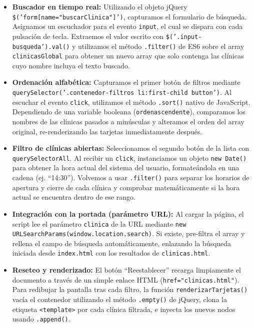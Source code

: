 \documentclass[11pt]{article}
\begin{document}
\begin{itemize}
\item \textbf{Buscador en tiempo real:} Utilizando el objeto jQuery \texttt{\$('form[name="buscarClinica"]')}, capturamos el formulario de búsqueda. Asignamos un escuchador para el evento \texttt{input}, el cual se dispara con cada pulsación de tecla. Extraemos el valor escrito con \texttt{\$('.input-busqueda').val()} y utilizamos el método \texttt{.filter()} de ES6 sobre el array \texttt{clinicasGlobal} para obtener un nuevo array que solo contenga las clínicas cuyo nombre incluya el texto buscado.
\item \textbf{Ordenación alfabética:} Capturamos el primer botón de filtros mediante \texttt{querySelector('.contenedor-filtros li:first-child button')}. Al escuchar el evento \texttt{click}, utilizamos el método \texttt{.sort()} nativo de JavaScript. Dependiendo de una variable booleana (\texttt{ordenascendente}), comparamos los nombres de las clínicas pasados a minúsculas y alteramos el orden del array original, re-renderizando las tarjetas inmediatamente después.
\item \textbf{Filtro de clínicas abiertas:} Seleccionamos el segundo botón de la lista con \texttt{querySelectorAll}. Al recibir un \texttt{click}, instanciamos un objeto \texttt{new Date()} para obtener la hora actual del sistema del usuario, formateándola en una cadena (ej. ``14:30''). Volvemos a usar \texttt{.filter()} para separar los horarios de apertura y cierre de cada clínica y comprobar matemáticamente si la hora actual se encuentra dentro de ese rango.
\item \textbf{Integración con la portada (parámetro URL):} Al cargar la página, el script lee el parámetro \texttt{clinica} de la URL mediante \texttt{new URLSearchParams(window.location.search)}. Si existe, pre-filtra el array y rellena el campo de búsqueda automáticamente, enlazando la búsqueda iniciada desde \texttt{index.html} con los resultados de \texttt{clinicas.html}.
\item \textbf{Reseteo y renderizado:} El botón ``Reestablecer'' recarga limpiamente el documento a través de un simple enlace HTML (\texttt{href="clinicas.html"}). Para redibujar la pantalla tras cada filtro, la función \texttt{renderizarTarjetas()} vacía el contenedor utilizando el método \texttt{.empty()} de jQuery, clona la etiqueta \texttt{<template>} por cada clínica filtrada, e inyecta los nuevos nodos usando \texttt{.append()}.
\end{itemize}
\end{document}
